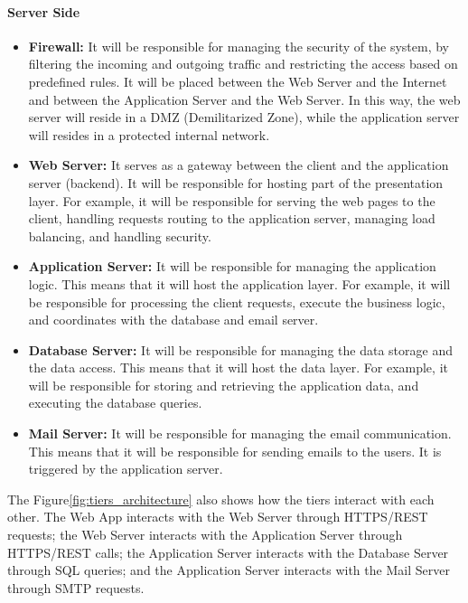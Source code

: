 \paragraph{Server Side}
\begin{itemize}
    \item \textbf{Firewall:} It will be responsible for managing the security of the system, by filtering the incoming and outgoing traffic and restricting
    the access based on predefined rules. It will be placed between the Web Server and the Internet and between the Application Server and the Web Server.
    In this way, the web server will reside in a DMZ (Demilitarized Zone), while the application server will resides in a protected internal network.
    \item \textbf{Web Server:} It serves as a gateway between the client and the application server (backend). It will be responsible for hosting part 
    of the presentation layer. For example, it will be responsible for serving the web pages to the client, handling requests routing to the application
    server, managing load balancing, and handling security.
    \item \textbf{Application Server:} It will be responsible for managing the application logic. This means that it will host the application layer. For 
    example, it will be responsible for processing the client requests, execute the business logic, and coordinates with the database and email server.
    \item \textbf{Database Server:} It will be responsible for managing the data storage and the data access. This means that it will host the data layer.
    For example, it will be responsible for storing and retrieving the application data, and executing the database queries.
    \item \textbf{Mail Server:} It will be responsible for managing the email communication. This means that it will be responsible for sending emails to 
    the users. It is triggered by the application server.
\end{itemize}

The Figure\ref{fig:tiers_architecture} also shows how the tiers interact with each other. The Web App interacts with the Web Server through HTTPS/REST 
requests; the Web Server interacts with the Application Server through HTTPS/REST calls; the Application Server interacts with the Database Server through 
SQL queries; and the Application Server interacts with the Mail Server through SMTP requests.

